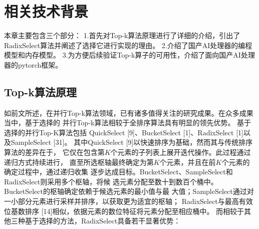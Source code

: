 \chapter{相关技术背景}
本章主要包含三个部分：
1.首先对Top-k算法原理进行了详细的介绍，引出了RadixSelect算法并阐述了选择它进行实现的理由。
2.介绍了国产AI处理器的编程模型和内存模型。
3.为方便后续验证Top-k算子的可用性，介绍了面向国产AI处理器的pytorch框架。
\section{Top-k算法原理}

如前文所述，在并行Top-k算法领域，已有诸多值得关注的研究成果。在众多成果当中，基于选择的
并行Top-k算法相较于全排序算法具有明显的领先优势。
基于选择的并行Top-K算法包括
QuickSelect [9]、BucketSelect [1]、RadixSelect [1]以及SampleSelect [31]。
其中QuickSelect [9]以快速排序为基础，然而其与传统排序算法的差异在于，
它仅在包含第$K$个元素的子列表上展开迭代操作。此过程通过递归方式持续进行，
直至所选枢轴最终确定为第$K$个元素，并且在前$K$个元素的确定过程中，通过递归收集
逐步达成目标。BucketSelect、SampleSelect和RadixSelect则采用多个枢轴，将候
选元素分配至数十到数百个桶中。BucketSelect的枢轴确定依赖于候选元素的最小值与最
大值；SampleSelect通过对一小部分元素进行采样并排序，以获取更为适宜的枢轴；
RadixSelect与最高有效位基数排序 [14]相似，依据元素的数位特征将元素分配至相应桶中。
而相较于其他三种基于选择的方法，RadixSelect具备若干显著优势：

